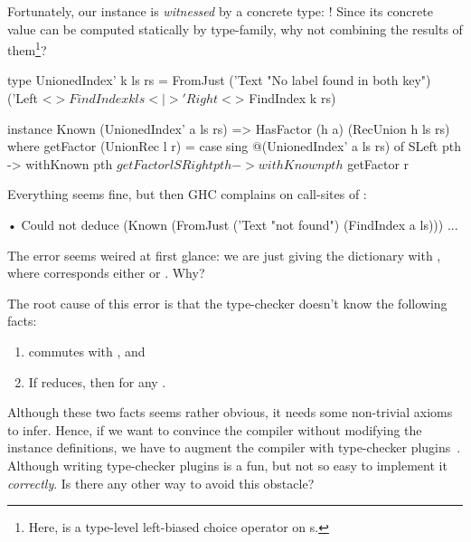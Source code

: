 \documentclass[demotion-paper.tex]{subfiles}
\begin{document}
Fortunately, our  instance is \emph{witnessed} by a concrete type: !
Since its concrete value can be computed statically by  type-family, why not combining the results of them\footnote{Here, \hask{(<|>)} is a type-level left-biased choice operator on s.}?
\begin{code}
type UnionedIndex' k ls rs =
  FromJust ('Text "No label found in both key")
    ('Left <$> FindIndex k ls
      <|> 'Right <$> FindIndex k rs)

instance Known (UnionedIndex' a ls rs)
  => HasFactor (h a) (RecUnion h ls rs) where
  getFactor (UnionRec l r) =
    case sing @(UnionedIndex' a ls rs) of
      SLeft pth -> withKnown pth $ getFactor l
      SRight pth -> withKnown pth $ getFactor r
\end{code}
Everything seems fine, but then GHC complains on call-sites of :
\begin{repl}
• Could not deduce (Known 
    (FromJust ('Text "not found") 
      (FindIndex a ls)))
...
\end{repl}
The error seems weired at first glance: we are just giving the  dictionary with , where  corresponds either  or . Why?

The root cause of this error is that the type-checker doesn't know the following facts:
\begin{enumerate}
  \item {} commutes with \hask{(<|>)}, and
  \item If  reduces, then  for any .
\end{enumerate}
Although these two facts seems rather obvious, it needs some non-trivial axioms to infer.
Hence, if we want to convince the compiler without modifying the instance definitions, we have to augment the compiler with type-checker plugins~\cite{GHC-Team:2020aa}.
Although writing type-checker plugins is a fun, but not so easy to implement it \emph{correctly}. Is there any other way to avoid this obstacle?
\end{document}
